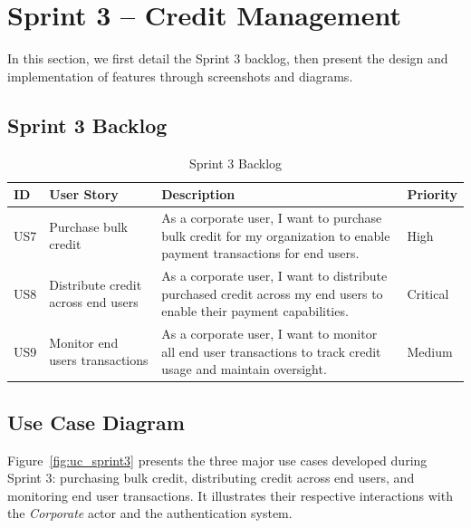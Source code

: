 \section{Sprint 3 – Credit Management}

In this section, we first detail the Sprint 3 backlog, then present the design and implementation of features through screenshots and diagrams.

\subsection{Sprint 3 Backlog}

\begin{table}[!htbp]
  \centering
  \small
  \caption{Sprint 3 Backlog} 
  \label{tab:backlog_sprint3}
  \renewcommand{\arraystretch}{1.2}
  \begin{tabular}{|p{1cm}|p{4cm}|p{7cm}|p{2cm}|}
    \hline
    \textbf{ID} & \textbf{User Story}               & \textbf{Description}                                                                                             & \textbf{Priority} \\ \hline
    US7         & Purchase bulk credit & As a corporate user, I want to purchase bulk credit for my organization to enable payment transactions for end users. & High            \\ \hline
    US8         & Distribute credit across end users       & As a corporate user, I want to distribute purchased credit across my end users to enable their payment capabilities. & Critical         \\ \hline
    US9         & Monitor end users transactions       & As a corporate user, I want to monitor all end user transactions to track credit usage and maintain oversight. & Medium          \\ \hline
  \end{tabular}
\end{table}

\vspace{4cm}

\subsection{Use Case Diagram}
Figure~\ref{fig:uc_sprint3} presents the three major use cases developed during Sprint 3: purchasing bulk credit, distributing credit across end users, and monitoring end user transactions. It illustrates their respective interactions with the \textit{Corporate} actor and the authentication system.

